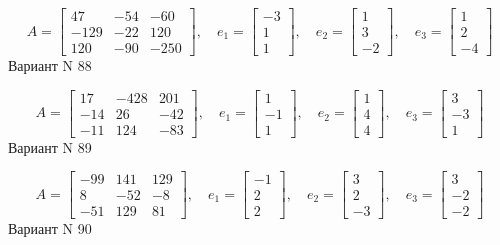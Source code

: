 \documentclass[11pt]{report}
\begin{document}
$$A = \left[\begin{matrix}47 & -54 & -60\\-129 & -22 & 120\\120 & -90 & -250\end{matrix}\right],\quad e_1 = \left[\begin{matrix}-3\\1\\1\end{matrix}\right],\quad e_2 = \left[\begin{matrix}1\\3\\-2\end{matrix}\right],\quad e_3 = \left[\begin{matrix}1\\2\\-4\end{matrix}\right]$$Вариант N 88

$$A = \left[\begin{matrix}17 & -428 & 201\\-14 & 26 & -42\\-11 & 124 & -83\end{matrix}\right],\quad e_1 = \left[\begin{matrix}1\\-1\\1\end{matrix}\right],\quad e_2 = \left[\begin{matrix}1\\4\\4\end{matrix}\right],\quad e_3 = \left[\begin{matrix}3\\-3\\1\end{matrix}\right]$$Вариант N 89

$$A = \left[\begin{matrix}-99 & 141 & 129\\8 & -52 & -8\\-51 & 129 & 81\end{matrix}\right],\quad e_1 = \left[\begin{matrix}-1\\2\\2\end{matrix}\right],\quad e_2 = \left[\begin{matrix}3\\2\\-3\end{matrix}\right],\quad e_3 = \left[\begin{matrix}3\\-2\\-2\end{matrix}\right]$$Вариант N 90
\end{document}
